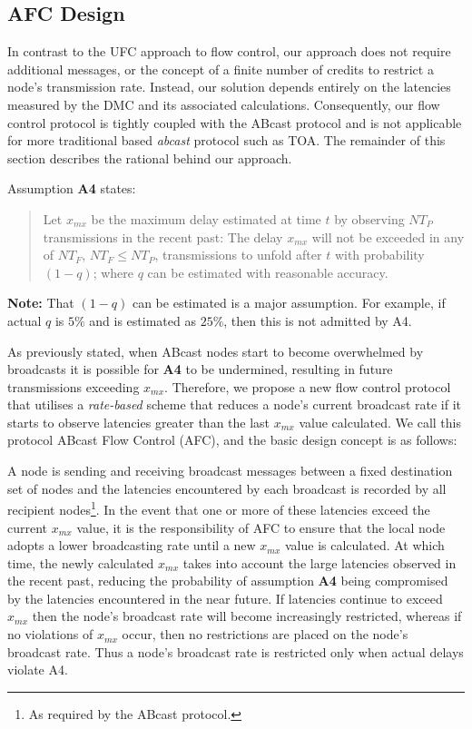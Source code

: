     \subsection{AFC Design}\label{sec:afc_protocol}
    In contrast to the \textsf{UFC} approach to flow control, our approach does not require additional messages, or the concept of a finite number of credits to restrict a node's transmission rate.  Instead, our solution depends entirely on the latencies measured by the DMC and its associated calculations.  Consequently, our flow control protocol is tightly coupled with the \textsf{ABcast} protocol and is not applicable for more traditional based \emph{abcast} protocol such as TOA.  The remainder of this section describes the rational behind our approach.  
    
    Assumption \textbf{A4} states:
    
    \begin{quotation}
            Let $x_{mx}$ be the maximum delay estimated at time $t$ by observing $NT_P$ transmissions in the recent past: The delay $x_{mx}$ will not be exceeded in any of $NT_F$, $NT_F \leq NT_P$, transmissions to unfold after $t$ with probability $(1 - q)$; where $q$ can be estimated with reasonable accuracy.  
        \end{quotation}
        
    \textbf{Note:} That $(1 - q)$ can be estimated is a major assumption.  For example, if actual $q$ is $5\%$ and is estimated as $25\%$, then this is not admitted by A4.  
    
    As previously stated, when \textsf{ABcast} nodes start to become overwhelmed by broadcasts it is possible for \textbf{A4} to be undermined, resulting in future transmissions exceeding $x_{mx}$.  Therefore, we propose a new flow control protocol that utilises a \emph{rate-based} scheme \citep{bertsekas1992DataNetworksFC} that reduces a node's current broadcast rate if it starts to observe latencies greater than the last $x_{mx}$ value calculated.  We call this protocol ABcast Flow Control (AFC), and the basic design concept is as follows: 
    
    A node is sending and receiving broadcast messages between a fixed destination set of nodes and the latencies encountered by each broadcast is recorded by all recipient nodes\footnote{As required by the \textsf{ABcast} protocol.}.  In the event that one or more of these latencies exceed the current $x_{mx}$ value, it is the responsibility of AFC to ensure that the local node adopts a lower broadcasting rate until a new $x_{mx}$ value is calculated.  At which time, the newly calculated $x_{mx}$ takes into account the large latencies observed in the recent past, reducing the probability of assumption \textbf{A4} being compromised by the latencies encountered in the near future.  If latencies continue to exceed $x_{mx}$ then the node's broadcast rate will become increasingly restricted, whereas if no violations of $x_{mx}$ occur, then no restrictions are placed on the node's broadcast rate. Thus a node's broadcast rate is restricted only when actual delays violate A4.  

